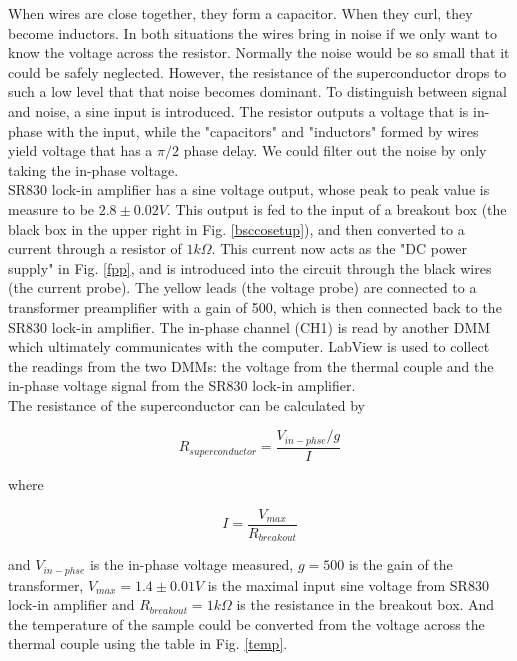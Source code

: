 \documentclass[prb,preprint]{revtex4-1}
\begin{document}
When wires are close together, they form a capacitor. When they curl, they become inductors. In both situations the wires bring in noise if we only want to know the voltage across the resistor. Normally the noise would be so small that it could be safely neglected. However, the resistance of the superconductor drops to such a low level that that noise becomes dominant. To distinguish between signal and noise, a sine input is introduced. The resistor outputs a voltage that is in-phase with the input, while the "capacitors" and "inductors" formed by wires yield voltage that has a $\pi/2$ phase delay. We could filter out the noise by only taking the in-phase voltage. \\

SR830 lock-in amplifier has a sine voltage output, whose peak to peak value is measure to be $2.8 \pm 0.02 V$. This output is fed to the input of a breakout box (the black box in the upper right in Fig. \ref{bsccosetup}), and then converted to a current through a resistor of $1k\Omega$. This current now acts as the "DC power supply" in Fig. \ref{fpp}, and is introduced into the circuit through the black wires (the current probe). The yellow leads (the voltage probe) are connected to a transformer preamplifier with a gain of 500, which is then connected back to the SR830 lock-in amplifier. The in-phase channel (CH1) is read by another DMM which ultimately communicates with the computer. LabView is used to collect the readings from the two DMMs: the voltage from the thermal couple and the in-phase voltage signal from the SR830 lock-in amplifier. \\

The resistance of the superconductor can be calculated by

\begin{equation}
R_{superconductor} = \frac{V_{in-phse}/g}{I}
\label{rofs}
\end{equation}

where

\begin{equation}
I=\frac{V_{max}}{R_{breakout}}
\label{current}
\end{equation}

and $V_{in-phse}$ is the in-phase voltage measured, $g=500$ is the gain of the transformer, $V_{max}=1.4\pm0.01V$ is the maximal input sine voltage from SR830 lock-in amplifier and $R_{breakout}=1k\Omega$ is the resistance in the breakout box. And the temperature of the sample could be converted from the voltage across the thermal couple using the table in Fig. \ref{temp}.\\
\end{document}
